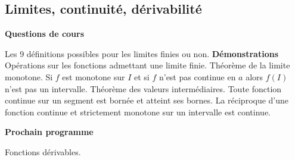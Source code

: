 







\subsection{Limites, continuité, dérivabilité}





%

\bigskip
\begin{center}
 \textbf{Questions de cours}
\end{center}
Les 9 définitions possibles pour les limites finies ou non.\newline 
\textbf{Démonstrations}\newline
Opérations sur les fonctions admettant une limite finie.\newline
Théorème de la limite monotone. Si $f$ est monotone sur $I$ et si $f$ n'est pas continue en $a$ alors $f(I)$ n'est pas un intervalle.\newline
Théorème des valeurs intermédiaires.\newline
Toute fonction continue sur un segment est bornée et atteint ses bornes.\newline
La réciproque d'une fonction continue et strictement monotone sur un intervalle est continue.

\begin{center}
 \textbf{Prochain programme}
\end{center}

Fonctions dérivables.

